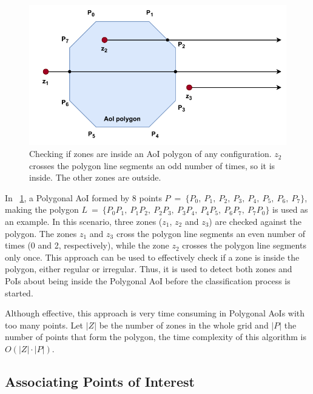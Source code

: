 \begin{refsection}
\begin{figure}[!ht]
  \centering
  \includegraphics[width=0.7\linewidth]{Chapters/5-AoM/img/zones_inside_polygon.pdf}
  \caption{Checking if zones are inside an AoI polygon of any configuration. $z_2$ crosses the polygon line segments an odd number of times, so it is inside. The other zones are outside.}\label{fig:check_zones_in_polygon}
\end{figure}

In \figurename~\ref{fig:check_zones_in_polygon}, a Polygonal AoI formed by 8 points $P~=~\{P_0,~P_1,~P_2,~P_3,~P_4,~P_5,~P_6,~P_7\}$, making the polygon $L~=~\{P_0P_1,~P_1P_2,~P_2P_3,~P_3P_4,~P_4P_5,~P_6P_7,~P_7P_0\}$ is used as an example. In this scenario, three zones ($z_1$, $z_2$ and $z_3$) are checked against the polygon. The zones $z_1$ and $z_3$ cross the polygon line segments an even number of times (0 and 2, respectively), while the zone $z_2$ crosses the polygon line segments only once. This approach can be used to effectively check if a zone is inside the polygon, either regular or irregular. Thus, it is used to detect both zones and PoIs about being inside the Polygonal AoI before the classification process is started.

Although effective, this approach is very time consuming in Polygonal AoIs with too many points. Let $|Z|$ be the number of zones in the whole grid and $|P|$ the number of points that form the polygon, the time complexity of this algorithm is $O(|Z|\cdot|P|)$.


\subsection{Associating Points of Interest}\label{subsec:risk_zones}


\end{refsection}
